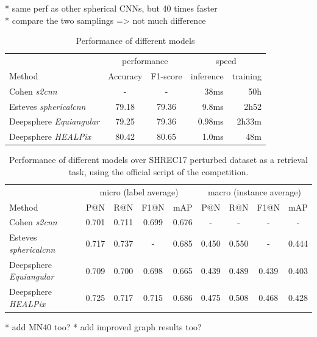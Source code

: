 \documentclass{article} %
\begin{document}
* same perf as other spherical CNNs, but 40 times faster \\
* compare the two samplings => not much difference \\

\begin{table}[ht]
    \centering
    \begin{tabular}{l|c c r r}
        \multicolumn{1}{l}{} & \multicolumn{2}{c}{performance} & \multicolumn{2}{c}{speed}\\
        \cmidrule(lr){2-3} \cmidrule(lr){4-5}
        \multicolumn{1}{l}{Method} & Accuracy & F1-score & inference & training \\ \hline
        Cohen \emph{s2cnn} & - & - & 38ms & 50h\\
        Esteves \emph{sphericalcnn} & 79.18 & 79.36 & 9.8ms & 2h52\\ \hline
        Deepsphere \emph{Equiangular} & 79.25 & 79.36 & 0.98ms & 2h33m \\
        Deepsphere \emph{HEALPix} & 80.42 & 80.65 & 1.0ms & 48m
    \end{tabular}
    \caption{Performance of different models}
    \label{tab:SHREC17_class}
\end{table}

\begin{table}[ht]
    \centering
    \begin{tabular}{l|c c c c|c c c c}
     & \multicolumn{4}{c|}{micro (label average)} & \multicolumn{4}{c}{macro (instance average)} \\
    Method & P@N & R@N & F1@N & mAP & P@N & R@N & F1@N & mAP \\ \hline
    Cohen \emph{s2cnn} & 0.701 & 0.711 & 0.699 & 0.676 & - & - & - & - \\
    Esteves \emph{sphericalcnn} & 0.717 & 0.737 & - & 0.685 & 0.450 & 0.550 & - & 0.444\\ \hline
    Deepsphere \emph{Equiangular} & 0.709 & 0.700 & 0.698 & 0.665 & 0.439 & 0.489 & 0.439 & 0.403 \\
    Deepsphere \emph{HEALPix} & 0.725 & 0.717 & 0.715 & 0.686 & 0.475 & 0.508 & 0.468 & 0.428
    \end{tabular}
    \caption{Performance of different models over SHREC17 perturbed dataset as a retrieval task, using the official script of the competition.}
    \label{tab:SHREC17_retriev}
\end{table}
* add MN40 too?
* add improved graph results too?
\end{document}
